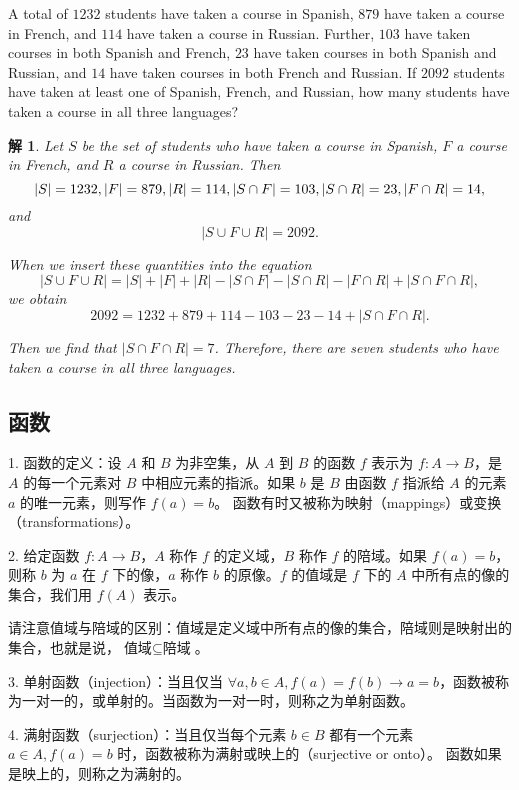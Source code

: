 \documentclass[normal,cyan]{elegantnote}
\newtheorem{solve}{解}
\begin{document}
\begin{example}
    A total of $1232$ students have taken a course in Spanish, $879$ have taken a course in French, and $114$ have taken a course in Russian. Further, $103$ have taken courses in both Spanish and French, $23$ have taken courses in both Spanish and Russian, and $14$ have taken courses in both French and Russian.
    If $2092$ students have taken at least one of Spanish, French, and Russian, how many students have taken a course in all three languages?
\end{example}
\begin{solve}
    Let $S$ be the set of students who have taken a course in Spanish, $F$ a course in French, and $R$ a course in Russian. Then $$|S| = 1232, |F| = 879, |R| = 114, \\ |S \cap F| = 103, |S \cap R| = 23, |F \cap R| = 14,$$ and $$|S \cup F \cup R| = 2092.$$

    When we insert these quantities into the equation $$|S \cup F \cup R| = |S| + |F| + |R| - |S \cap F| - |S \cap R| - |F \cap R| + |S \cap F \cap R|,$$ we obtain $$2092 = 1232 + 879 + 114 - 103 - 23 - 14 + |S \cap F \cap R|.$$

    Then we find that $|S \cap F \cap R| = 7$. Therefore, there are seven students who have taken a course in all three languages.
\end{solve}
\subsection{函数}
1. 函数的定义：设 $A$ 和 $B$ 为非空集，从 $A$ 到 $B$ 的函数 $f$ 表示为 $f:A \to B$，是 $A$ 的每一个元素对 $B$ 中相应元素的指派。如果 $b$ 是 $B$ 由函数 $f$ 指派给 $A$ 的元素 $a$ 的唯一元素，则写作 $f(a) = b$。
函数有时又被称为映射（mappings）或变换（transformations）。

2. 给定函数 $f:A \to B$，$A$ 称作 $f$ 的定义域，$B$ 称作 $f$ 的陪域。如果 $f(a) = b$，则称 $b$ 为 $a$ 在 $f$ 下的像，$a$ 称作 $b$ 的原像。$f$ 的值域是 $f$ 下的 $A$ 中所有点的像的集合，我们用 $f(A)$ 表示。
\begin{note}
    请注意值域与陪域的区别：值域是定义域中所有点的像的集合，陪域则是映射出的集合，也就是说，$\text{值域}\subseteq\text{陪域}$。
\end{note}

3. 单射函数（injection）：当且仅当 $\forall a, b \in A, f(a) = f(b) \to a = b$，函数被称为一对一的，或单射的。当函数为一对一时，则称之为单射函数。

4. 满射函数（surjection）：当且仅当每个元素 $b \in B$ 都有一个元素 $a \in A, f(a) = b$ 时，函数被称为满射或{\color{red}映上}的（surjective or onto）。
函数如果是映上的，则称之为满射的。
\end{document}
